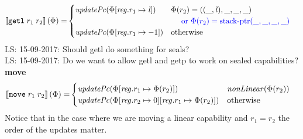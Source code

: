 \documentclass[a4paper]{article}
\newcommand\lau[1]{{\color{purple} \sf \footnotesize {LS: #1}}\\}
\newcommand{\sem}[1]{\left\llbracket #1 \right\rrbracket}
\newcommand{\tor}{\text{ or }}
\newcommand{\totherwise}{\text{otherwise }}
\newcommand{\sourcecolor}[1]{\color{blue}}
\newcommand{\src}[1]{{\sourcecolor{} #1}}
\newcommand{\targetcolor}[1]{\color{black}}
\newcommand{\trg}[1]{{\targetcolor{} #1}}
\newcommand{\zinstr}[1]{\texttt{#1}}
\newcommand{\twoinstr}[3]{
  \ifthenelse{\equal{#2#3}{}}
  {\zinstr{#1}}
  {\zinstr{#1} \; #2 \; #3}
}
\newcommand{\tgetlin}[2]{\twoinstr{\trg{getl}}{#1}{#2}}
\newcommand{\tmove}[2]{\twoinstr{\trg{move}}{#1}{#2}}
\newcommand{\update}[2]{[#1 \mapsto #2]}
\newcommand{\updReg}[2]{\update{\reg.#1}{#2}}
\newcommand{\lin}{\var{l}}
\newcommand{\stkptr}[1]{\mathrm{stack\text{-}ptr}(#1)}
\newcommand{\var}[1]{\mathit{#1}}
\newcommand{\reg}{\var{reg}}
\newcommand{\plainfun}[2]{
  \ifthenelse{\equal{#2}{}}
  {\mathit{#1}}
  {\mathit{#1}(#2)}
}
\newcommand{\updPcAddr}[1]{\plainfun{updatePc}{#1}}
\newcommand{\nonLinear}[1]{\plainfun{nonLinear}{#1}}
\begin{document}
\begin{align*}
  \sem{\tgetlin{r_1}{r_2}}(\Phi) = & 
                                   \begin{cases}
                                     \updPcAddr{\Phi\updReg{r_1}{\lin}} & 
                                     \arraycolsep=0pt
                                     \begin{array}[t]{l}
                                       \Phi(r_2) = ((\_,\lin),\_,\_,\_) \\
                                       \quad \src{\tor \Phi(r_2) = \stkptr{\_,\_,\_,\_} } \\
                                     \end{array} \\
                                     \updPcAddr{\Phi\updReg{r_1}{-1}} & \totherwise
                                   \end{cases}
\end{align*}
\lau{15-09-2017: Should getl do something for seals?}
\lau{15-09-2017: Do we want to allow getl and getp to work on sealed capabilities?}

\noindent\textbf{move}\\
\begin{align*}
  \sem{\tmove{r_1}{r_2}}(\Phi) = & 
                              \begin{cases}
                                \updPcAddr{\Phi\updReg{r_1}{\Phi(r_2)}} & \nonLinear{\Phi(r_2)}\\
                                \updPcAddr{\Phi\updReg{r_2}{0}\updReg{r_1}{\Phi(r_2)}} & \totherwise 
                              \end{cases}
\end{align*}
Notice that in the case where we are moving a linear capability and $r_1 = r_2$ the order of the updates matter.
\end{document}
